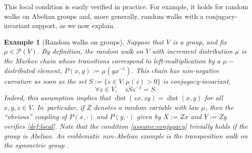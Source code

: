 \documentclass[10pt]{amsart}
\newtheorem{example}{Example}
\theoremstyle{definition}
\newcommand{\cP}{\mathcal{P}}
\DeclareMathOperator{\dist}{dist}
\begin{document}
This local condition is easily verified in practice. For example, it holds for random walks on Abelian groups and, more generally, random walks with a conjugacy-invariant support, as we now explain.
\begin{example}[Random walks on groups] Suppose that $V$ is a group, and fix $\mu\in\cP(V)$. By definition, the \emph{random walk} on $V$ with increment distribution $\mu$ is the Markov chain whose transitions correspond to left-multiplication by a $\mu-$distributed element, \ie
$
P(x,y) := \mu(y x^{-1}).
$
This chain has non-negative curvature as soon as the set $S:=\{z\in V\colon\mu(z)>0\}$ is \emph{conjugacy-invariant}, \ie
\begin{equation}
\label{assume:conjugacy}
\forall z\in V,\quad z S z^{-1} = S.
\end{equation}
Indeed, this assumption implies that $\dist(zx,zy)=\dist(x,y)$ for all $x,y,z\in V$. In~particular, if $Z$ denotes a random variable with law $\mu$, then the ``obvious'' coupling of $P(x,\cdot)$ and $P(y,\cdot)$ given by $X:=Zx$ and $Y:=Zy$ verifies \eqref{def:local}. Note that the condition \eqref{assume:conjugacy} trivially holds if the group is Abelian. An emblematic non-Abelian example is the transposition walk on the symmetric group \cite{MR3936154}.
\end{example}
\end{document}
